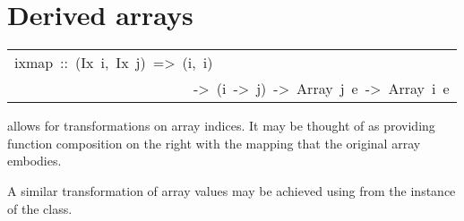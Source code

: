 \section{Derived arrays
}
\begin{haddockdesc}
\item[\begin{tabular}{@{}l}
ixmap\ ::\ (Ix\ i,\ Ix\ j)\ =>\ (i,\ i)\\\ \ \ \ \ \ \ \ \ \ \ \ \ \ \ \ \ \ \ \ \ \ \ \ \ ->\ (i\ ->\ j)\ ->\ Array\ j\ e\ ->\ Array\ i\ e
\end{tabular}]\haddockbegindoc
{} allows for transformations on array indices.
 It may be thought of as providing function composition on the right
 with the mapping that the original array embodies.
\par
A similar transformation of array values may be achieved using 
 from the  instance of the  class.
\par

\end{haddockdesc}

